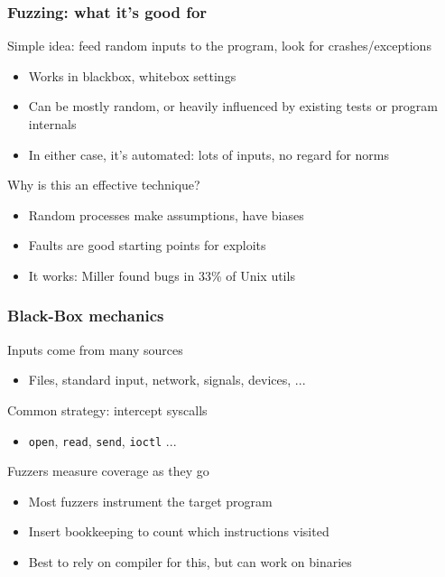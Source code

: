\documentclass[10pt,xcolor={dvipsnames}]{beamer}
\begin{document}

\begin{frame}

\frametitle{Fuzzing: what it's good for}

Simple idea: feed random inputs to the program, look for crashes/exceptions
\begin{itemize}
\item Works in blackbox, whitebox settings \\[0.5em]
\item Can be mostly random, or heavily influenced by existing tests or program internals \\[0.5em]
\item In either case, it's automated: lots of inputs, no regard for norms \\[1.5em]
\end{itemize}

\pause
Why is this an effective technique?
\begin{itemize}
\item Random processes make assumptions, have biases \\[0.5em]
\item Faults are good starting points for exploits \\[0.5em]
\item It works: Miller found bugs in 33\% of Unix utils
\end{itemize}

\end{frame}


\begin{frame}

\frametitle{Black-Box mechanics}

Inputs come from many sources
\begin{itemize}
\item Files, standard input, network, signals, devices, ... \\[1.5em]
\end{itemize}

\pause
Common strategy: intercept syscalls
\begin{itemize}
\item \texttt{open}, \texttt{read}, \texttt{send}, \texttt{ioctl} ... \\[1.5em]
\end{itemize}

\pause
Fuzzers measure coverage as they go
\begin{itemize}
\pause\item Most fuzzers instrument the target program \\[0.5em]
\pause\item Insert bookkeeping to count which instructions visited \\[0.5em]
\pause\item Best to rely on compiler for this, but can work on binaries
\end{itemize}

\end{frame}
\end{document}
